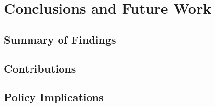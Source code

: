 \chapter{Conclusions and Future Work}
\label{ch:conclusions}


\section{Summary of Findings}
\label{sec:summary}


\section{Contributions}
\label{sec:contributions}


\section{Policy Implications}
\label{sec:policy}

